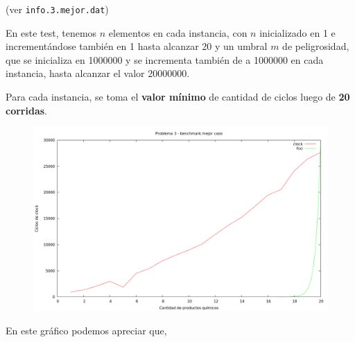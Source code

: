 (ver \verb|info.3.mejor.dat|) \medskip

En este test, tenemos $n$ elementos en cada instancia, con $n$ inicializado en 1 e incrementándose 
también en 1 hasta alcanzar 20 y un umbral $m$ de peligrosidad, que se inicializa en 1000000 y se incrementa 
también de a 1000000 en cada instancia, hasta alcanzar el valor 20000000.
 
Para cada instancia, se toma el \textbf{valor mínimo} de cantidad de ciclos luego de \textbf{20 corridas}.


\begin{figure}[h]
  \begin{center}
    \includegraphics[scale=0.35]{imagenes/grafico-3-mejor.png}
  \end{center}
\end{figure}


En este gráfico podemos apreciar que,
